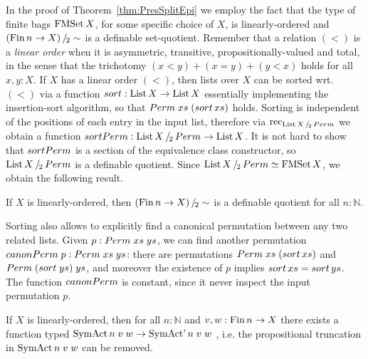 \documentclass[a4paper,USenglish,cleveref]{lipics-v2021}
\begin{document}
In the proof of Theorem~\ref{thm:PresSplitEpi} we employ the fact that the type of finite bags $\FMSet X$, for some specific choice of $X$, is linearly-ordered and $\SetQuot[(\Fin n \to X)][\sim]$ is a definable set-quotient.
Remember that a relation $(<)$ is a \emph{linear order} when it is asymmetric, transitive, propositionally-valued and total, in the sense that the trichotomy $(x < y) + (x = y) + (y < x)$ holds for all $x,y:X$.
If $X$ has a linear order $(<)$, then lists over $X$ can be sorted wrt. $(<)$ via a function $\sort : \List X \to \List X$ essentially implementing the insertion-sort algorithm, so that $\Perm \;xs\;(\sort\,xs)$ holds. Sorting is independent of the positions of each entry in the input list, therefore via $\Rec{\SetQuot[\List X][\Perm]}$ we obtain a function $\sortPerm : \SetQuot[\List X][\Perm] \to \List X$. It is not hard to show that $\sortPerm$ is a section of the equivalence class constructor, so $\SetQuot[\List X][\Perm]$ is a definable quotient.
Since $\SetQuot[\List X][\Perm] \simeq \FMSet X$, we obtain the following result.
\begin{proposition}\label{prop:ListPermDefQuot}
If $X$ is linearly-ordered, then $\SetQuot[(\Fin n \to X)][\sim]$ is a definable quotient for all $n : ℕ$.
\end{proposition}

Sorting also allows to explicitly find a canonical permutation between any two related lists. Given $p : \Perm \;xs\;ys$, we can find another permutation $\canonicalPerm \;p : \Perm\;xs\;ys$: there are permutations $\Perm\;xs\;(\sort\,xs)$ and $\Perm\;(\sort\;ys)\;ys$, and moreover the existence of $p$ implies $\sort\,xs = \sort\,ys$. The function $\canonicalPerm$ is constant, since it never inspect the input permutation $p$. 
\begin{proposition}\label{prop:ListPermCanonicalPerm}
If $X$ is linearly-ordered, then for all $n : ℕ$ and $v,w : \Fin n \to X$ there exists a function typed $\SymAct n\; v\; w \to \SymActSigma n \;v \; w$ , i.e. the propositional truncation in $\SymAct n\; v\; w$ can be removed.
\end{proposition}
\end{document}
